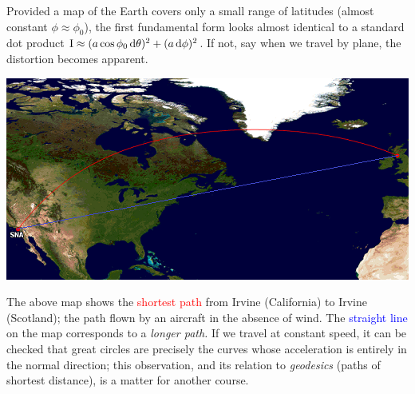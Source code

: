 \goodbreak

Provided a map of the Earth covers only a small range of latitudes (almost constant $\phi\approx\phi_0$), the first fundamental form looks almost identical to a standard dot product $\mathrm{I}\approx (a\cos\phi_0\,{\mathrm{d}\theta})^2+(a\,\mathrm{d}\phi)^2$. If not, say when we travel by plane, the distortion becomes apparent.
\begin{center}
\includegraphics{fund-irvine.png}
\end{center}
The above map shows the \textcolor{red}{shortest path} from Irvine (California) to Irvine (Scotland); the path flown by an aircraft in the absence of wind. The \textcolor{blue}{straight line} on the map corresponds to a \emph{longer path.}\smallbreak
If we travel at constant speed, it can be checked that great circles are precisely the curves whose acceleration is entirely in the normal direction; this observation, and its relation to \emph{geodesics} (paths of shortest distance), is a matter for another course.


